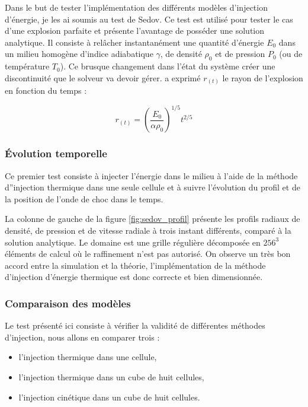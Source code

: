 Dans le but de tester l'implémentation des différents modèles d'injection d'énergie, je les ai soumis au test de Sedov.
Ce test est utilisé pour tester le cas d'une explosion parfaite et présente l'avantage de posséder une solution analytique.
Il consiste à relâcher instantanément une quantité d'énergie $E_0$ dans un milieu homogène d'indice adiabatique $\gamma$, de densité $\rho_0$ et de pression $P_0$ (ou de température $T_0$).
Ce brusque changement dans l'état du système créer une discontinuité que le solveur va devoir gérer.
\cite{sedov_similarity_1959} a exprimé $r_{(t)}$ le rayon de l'explosion en fonction du temps  : 

\begin{equation}
r_{(t)}=\left( \frac{E_0}{\alpha \rho_0 }\right)^{1/5} t^{2/5}
\end{equation}


\subsubsection{Évolution temporelle }


Ce premier test consiste à injecter l'énergie dans le milieu à l'aide de la méthode d''injection thermique dans une seule cellule et à suivre l'évolution du profil et de la position de l'onde de choc dans le temps.

La colonne de gauche de la figure \ref{fig:sedov_profil} présente les profils radiaux de densité, de pression et de vitesse radiale à trois instant différents, comparé à la solution analytique.
Le domaine est une grille régulière décomposée en $256^3$ éléments de calcul où le raffinement n'est pas autorisé.
On observe un très bon accord entre la simulation et la théorie, l'implémentation de la méthode d'injection d'énergie thermique est donc correcte et bien dimensionnée.

\subsubsection{Comparaison des modèles}

Le test présenté ici consiste à vérifier la validité de différentes méthodes d'injection, nous allons en comparer trois : 
\begin{itemize}
\item l'injection thermique dans une cellule,
\item l'injection thermique dans un cube de huit cellules,
\item l'injection cinétique dans un cube de huit cellules.
\end{itemize}

